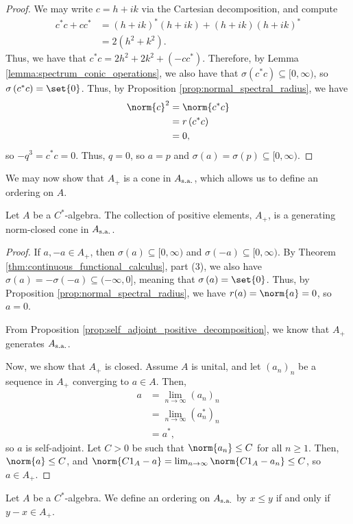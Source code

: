 \begin{proof}
  We may write $c = h + ik$ via the Cartesian decomposition, and compute
  \begin{align*}
    c^{\ast}c + cc^{\ast} &= \left( h + ik \right)^{\ast}\left( h + ik \right) + \left( h + ik \right)\left( h + ik \right)^{\ast}\\
                          &= 2\left( h^2 + k^2 \right).
  \end{align*}
  Thus, we have that $c^{\ast}c = 2h^2 + 2k^2 + \left( -cc^{\ast} \right)$. Therefore, by Lemma \ref{lemma:spectrum_conic_operations}, we also have that $\sigma\left( c^{\ast}c \right)\subseteq [0,\infty)$, so $\sigma\left( c^{\ast}c \right) = \set{0}$. Thus, by Proposition \ref{prop:normal_spectral_radius}, we have
  \begin{align*}
    \norm{c}^2 &= \norm{c^{\ast}c}\\
               &= r\left( c^{\ast}c \right)\\
               &= 0,
  \end{align*}
  so $-q^3 = c^{\ast}c = 0$. Thus, $q = 0$, so $a = p$ and $\sigma\left( a \right) = \sigma\left( p \right)\subseteq [0,\infty)$.
\end{proof}
We may now show that $A_{+}$ is a cone in $A_{\operatorname{s.a.}}$, which allows us to define an ordering on $A$.
\begin{corollary}
  Let $A$ be a $C^{\ast}$-algebra. The collection of positive elements, $A_{+}$, is a generating norm-closed cone in $A_{\operatorname{s.a.}}$.
\end{corollary}
\begin{proof}
  If $a,-a\in A_{+}$, then $\sigma\left( a \right)\subseteq [0,\infty)$ and $\sigma\left( -a \right) \subseteq [0,\infty)$. By Theorem \ref{thm:continuous_functional_calculus}, part (3), we also have $\sigma\left( a \right) = -\sigma\left( -a \right)\subseteq (-\infty,0]$, meaning that $\sigma\left( a \right) = \set{0}$. Thus, by Proposition \ref{prop:normal_spectral_radius}, we have $r(a) = \norm{a} = 0$, so $a = 0$.\newline

  From Proposition \ref{prop:self_adjoint_positive_decomposition}, we know that $A_{+}$ generates $A_{\operatorname{s.a.}}$.\newline

  Now, we show that $A_{+}$ is closed. Assume $A$ is unital, and let $\left( a_n \right)_n$ be a sequence in $A_{+}$ converging to $a\in A$. Then,
  \begin{align*}
    a &= \lim_{n\rightarrow\infty}\left( a_n \right)_n\\
      &= \lim_{n\rightarrow\infty}\left( a_n^{\ast} \right)_n\\
      &= a^{\ast},
  \end{align*}
  so $a$ is self-adjoint. Let $C > 0$ be such that $\norm{a_n}\leq C$ for all $n\geq 1$. Then, $\norm{a}\leq C$, and $\norm{C1_A - a} = \lim_{n\rightarrow\infty}\norm{C1_A - a_n}\leq C$, so $a\in A_{+}$.
\end{proof}
\begin{definition}\label{def:ordering_of_cstar_algebras}
  Let $A$ be a $C^{\ast}$-algebra. We define an ordering on $A_{\operatorname{s.a.}}$ by $x\leq y$ if and only if $y-x\in A_{+}$.
\end{definition}
